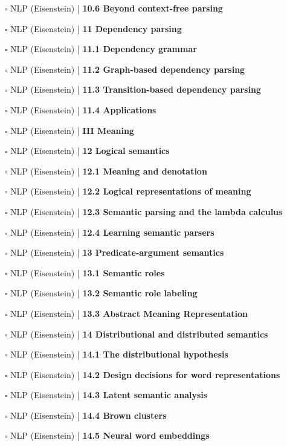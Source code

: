 \documentclass[a4, landscape, 12pt]{article}
\newcommand{\checkbox}{$\square$}%
\begin{document}
\begin{itemize}
{}
\item [\checkbox]  NLP (Eisenstein) | \textbf{ 10.6 Beyond context-free parsing
}
\item [\checkbox]  NLP (Eisenstein) | \textbf{ 11 Dependency parsing
}
\item [\checkbox]  NLP (Eisenstein) | \textbf{ 11.1 Dependency grammar
}
\item [\checkbox]  NLP (Eisenstein) | \textbf{ 11.2 Graph-based dependency parsing
}
\item [\checkbox]  NLP (Eisenstein) | \textbf{ 11.3 Transition-based dependency parsing
}
\item [\checkbox]  NLP (Eisenstein) | \textbf{ 11.4 Applications
}
\item [\checkbox]  NLP (Eisenstein) | \textbf{ III Meaning
}
\item [\checkbox]  NLP (Eisenstein) | \textbf{ 12 Logical semantics
}
\item [\checkbox]  NLP (Eisenstein) | \textbf{ 12.1 Meaning and denotation
}
\item [\checkbox]  NLP (Eisenstein) | \textbf{ 12.2 Logical representations of meaning
}
\item [\checkbox]  NLP (Eisenstein) | \textbf{ 12.3 Semantic parsing and the lambda calculus
}
\item [\checkbox]  NLP (Eisenstein) | \textbf{ 12.4 Learning semantic parsers
}
\item [\checkbox]  NLP (Eisenstein) | \textbf{ 13 Predicate-argument semantics
}
\item [\checkbox]  NLP (Eisenstein) | \textbf{ 13.1 Semantic roles
}
\item [\checkbox]  NLP (Eisenstein) | \textbf{ 13.2 Semantic role labeling
}
\item [\checkbox]  NLP (Eisenstein) | \textbf{ 13.3 Abstract Meaning Representation
}
\item [\checkbox]  NLP (Eisenstein) | \textbf{ 14 Distributional and distributed semantics
}
\item [\checkbox]  NLP (Eisenstein) | \textbf{ 14.1 The distributional hypothesis
}
\item [\checkbox]  NLP (Eisenstein) | \textbf{ 14.2 Design decisions for word representations
}
\item [\checkbox]  NLP (Eisenstein) | \textbf{ 14.3 Latent semantic analysis
}
\item [\checkbox]  NLP (Eisenstein) | \textbf{ 14.4 Brown clusters
}
\item [\checkbox]  NLP (Eisenstein) | \textbf{ 14.5 Neural word embeddings
}
\end{itemize}
\end{document}
